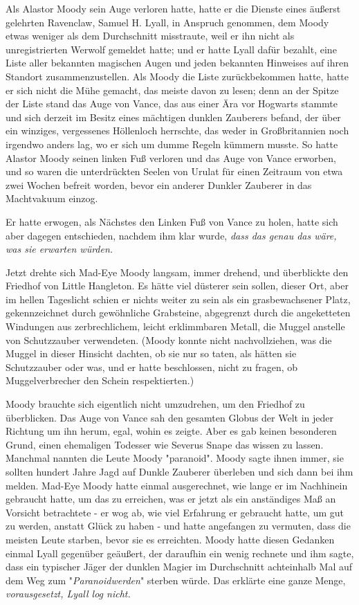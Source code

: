{Als Alastor Moody sein Auge verloren hatte, hatte er die Dienste eines äußerst gelehrten Ravenclaw, Samuel H. Lyall, in Anspruch genommen, dem Moody etwas weniger als dem Durchschnitt misstraute, weil er ihn nicht als unregistrierten Werwolf gemeldet hatte; und er hatte Lyall dafür bezahlt, eine Liste aller bekannten magischen Augen und jeden bekannten Hinweises auf ihren Standort zusammenzustellen. Als Moody die Liste zurückbekommen hatte, hatte er sich nicht die Mühe gemacht, das meiste davon zu lesen; denn an der Spitze der Liste stand das Auge von Vance, das aus einer Ära vor Hogwarts stammte und sich derzeit im Besitz eines mächtigen dunklen Zauberers befand, der über ein winziges, vergessenes Höllenloch herrschte, das weder in Großbritannien noch irgendwo anders lag, wo er sich um dumme Regeln kümmern musste. So hatte Alastor Moody seinen linken Fuß verloren und das Auge von Vance erworben, und so waren die unterdrückten Seelen von Urulat für einen Zeitraum von etwa zwei Wochen befreit worden, bevor ein anderer Dunkler Zauberer in das Machtvakuum einzog.

Er hatte erwogen, als Nächstes den Linken Fuß von Vance zu holen, hatte sich aber dagegen entschieden, nachdem ihm klar wurde, \emph{dass das genau das wäre, was sie erwarten würden.}

Jetzt drehte sich Mad-Eye Moody langsam, immer drehend, und überblickte den Friedhof von Little Hangleton. Es hätte viel düsterer sein sollen, dieser Ort, aber im hellen Tageslicht schien er nichts weiter zu sein als ein grasbewachsener Platz, gekennzeichnet durch gewöhnliche Grabsteine, abgegrenzt durch die angeketteten Windungen aus zerbrechlichem, leicht erklimmbaren Metall, die Muggel anstelle von Schutzzauber verwendeten. (Moody konnte nicht nachvollziehen, was die Muggel in dieser Hinsicht dachten, ob sie nur so taten, als hätten sie Schutzzauber oder was, und er hatte beschlossen, nicht zu fragen, ob Muggelverbrecher den Schein respektierten.)

Moody brauchte sich eigentlich nicht umzudrehen, um den Friedhof zu überblicken. Das Auge von Vance sah den gesamten Globus der Welt in jeder Richtung um ihn herum, egal, wohin es zeigte. Aber es gab keinen besonderen Grund, einen ehemaligen Todesser wie Severus Snape das wissen zu lassen. Manchmal nannten die Leute Moody "paranoid". Moody sagte ihnen immer, sie sollten hundert Jahre Jagd auf Dunkle Zauberer überleben und sich dann bei ihm melden. Mad-Eye Moody hatte einmal ausgerechnet, wie lange er im Nachhinein gebraucht hatte, um das zu erreichen, was er jetzt als ein anständiges Maß an Vorsicht betrachtete - er wog ab, wie viel Erfahrung er gebraucht hatte, um gut zu werden, anstatt Glück zu haben - und hatte angefangen zu vermuten, dass die meisten Leute starben, bevor sie es erreichten. Moody hatte diesen Gedanken einmal Lyall gegenüber geäußert, der daraufhin ein wenig rechnete und ihm sagte, dass ein typischer Jäger der dunklen Magier im Durchschnitt achteinhalb Mal auf dem Weg zum "\emph{Paranoidwerden}" sterben würde. Das erklärte eine ganze Menge, \emph{vorausgesetzt, Lyall log nicht.}

}
